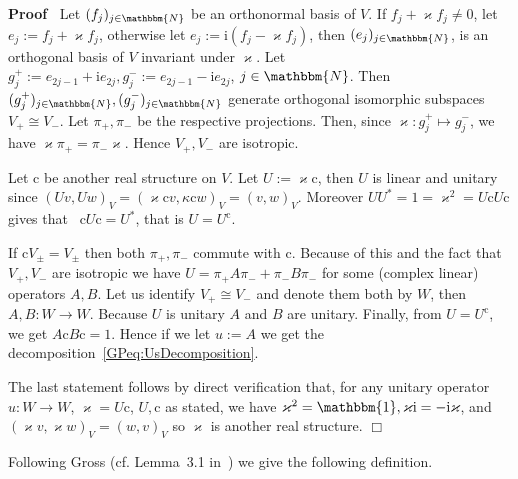 \documentclass[11pt]{article}
\newcommand{\assign}{:=}
\newcommand{\mathi}{\mathrm{i}}
\newenvironment{proof}{\noindent\textbf{Proof\ }}{\hspace*{\fill}$\Box$\medskip}
\begin{document}
\begin{proof}
  Let $(f_j)_{j \in \mathbbm{N}}$ be an orthonormal basis of $V$. If $f_j +
  \varkappa f_j \neq 0$, let $e_j \assign f_j + \varkappa f_j$, otherwise let
  $e_j \assign \mathi (f_j - \varkappa f_j)$, then $(e_j)_{j \in \mathbbm{N}}$,
  is an orthogonal basis of $V$ invariant under $\varkappa$. Let $g^+_j
  \assign e_{2 j - 1} + \mathi e_{2 j}, g^-_j \assign e_{2 j - 1} - \mathi
  e_{2 j}$, $j \in \mathbbm{N}$. Then $(g_j^+)_{j \in \mathbbm{N}}, (g_j^-)_{j
  \in \mathbbm{N}}$ generate orthogonal isomorphic subspaces $V_+ \cong V_-$.
  Let $\pi_+, \pi_-$ be the respective projections. Then, since $\varkappa :
  g^+_j \mapsto g_j^-$, we have $\varkappa \pi_+ = \pi_- \varkappa$. Hence
  $V_+, V_-$ are isotropic.
  
  Let $\mathrm{c}$ be another real structure on $V$. Let $U \assign \varkappa
  \mathrm{c}$, then $U$ is linear and unitary since $(U v, U w)_V = (\varkappa
  \mathrm{c}v, \kappa \mathrm{c}w)_V = (v, w)_V$. Moreover $U U^{\ast} = 1 =
  \varkappa^2 = U\mathrm{c}U\mathrm{c}$ gives that \ $\mathrm{c}U\mathrm{c}=
  U^{\ast}$, that is $U = U^{\mathrm{c}}$.
  
  If $\mathrm{c}V_{\pm} = V_{\pm}$ then both $\pi_+, \pi_-$ commute with
  $\mathrm{c}$. Because of this and the fact that $V_+, V_-$ are isotropic we
  have $U = \pi_+ A \pi_- + \pi_- B \pi_-$ for some (complex linear) operators
  $A, B$. Let us identify $V_+ \cong V_-$ and denote them both by $W$, then
  $A, B : W \rightarrow W$. Because $U$ is unitary $A$ and $B$ are unitary.
  Finally, from $U = U^{\mathrm{c}}$, we get $A\mathrm{c}B\mathrm{c}= 1$.
  Hence if we let $u \assign A$ we get the
  decomposition~{\eqref{GPeq:UsDecomposition}}.
  
  The last statement follows by direct verification that, for any unitary
  operator $u : W \rightarrow W$, $\varkappa = U\mathrm{c}$, $U, \mathrm{c}$
  as stated, we have $\varkappa^2 =\mathbbm{1}, \varkappa \mathi = - \mathi
  \varkappa$, and $(\varkappa v, \varkappa w)_V = (w, v)_V$ so $\varkappa$ is
  another real structure.
\end{proof}

Following Gross (cf. Lemma~3.1 in~{\cite{Gross_Euclidean_1976}}) we give the
following definition.
\end{document}
